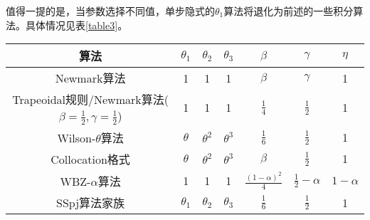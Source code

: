 值得一提的是，当参数选择不同值，单步隐式的$\theta_1$算法将退化为前述的一些积分算法。具体情况见表\ref{table3}。
\begin{table}[htbp]
\vspace{0.5em}\centering\wuhao
\begin{tabular}{ccccccc}
\toprule[1.5pt]
算法 & $\theta_1$ & $\theta_2$ & $\theta_3$ & $\beta$ & $\gamma$ & $\eta$\\
\midrule[1pt]
Newmark算法 & 1 & 1 & 1 & $\beta$ & $\gamma$ & 1\\ [0.5em]
Trapeoidal规则/Newmark算法($\beta=\frac{1}{2},\gamma=\frac12$) & 1 & 1 & 1 & $\frac{1}{4}$ & $\frac12$ & 1\\ [0.5em]
Wilson-$\theta$算法 & $\theta$ & $\theta^2$ & $\theta^3$ & $\frac16$ & $\frac{1}{2}$ & 1 \\ [0.5em]
Collocation格式\cite{Hilber1978a} & $\theta$ & $\theta^2$ & $\theta^3$ & $\beta$ & $\frac{1}{2}$ & 1 \\ [0.5em]
WBZ-$\alpha$算法 & 1 & 1 & 1 & $\frac{(1-\alpha)^2}{4}$ & $\frac{1}{2}-\alpha$ & $1-\alpha$ \\ [0.5em]
SSpj算法家族\cite{Zienkiewicz1984b,Wood1984a} & $\theta_1$ & $\theta_2$ & $\theta_3$ & $\frac16$ & $\frac{1}{2}$ & 1 \\
\bottomrule[1.5pt]
\end{tabular}
\end{table}

